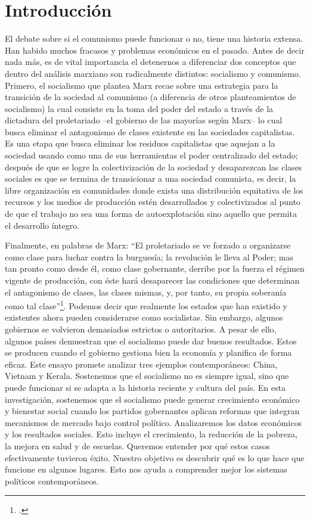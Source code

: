 \documentclass[12pt, letterpaper]{article}
\begin{document}
\section*{Introducción}
\thispagestyle{fancy}
El debate sobre si el comunismo puede funcionar o no, tiene una historia extensa. Han habido muchos fracasos y problemas económicos en el pasado. Antes de decir nada más, es de vital importancia el detenernos a diferenciar dos conceptos que dentro del análisis marxiano son radicalmente distintos: socialismo y comunismo. Primero, el socialismo que plantea Marx recae sobre una estrategia para la transición de la sociedad al comunismo (a diferencia de otros planteamientos de socialismo) la cual consiste en la toma del poder del estado a través de la dictadura del proletariado –el gobierno de las mayorías según Marx– lo cual busca eliminar el antagonismo de clases existente en las sociedades capitalistas. Es una etapa que busca eliminar los residuos capitalistas que aquejan a la sociedad usando como una de sus herramientas el poder centralizado del estado; después de que se logre la colectivización de la sociedad y desaparezcan las clases sociales es que se termina de transicionar a una sociedad comunista, es decir, la libre organización en comunidades donde exista una distribución equitativa de los recursos y los medios de producción estén desarrollados y colectivizados al punto de que el trabajo no sea una forma de autoexplotación sino aquello que permita el desarrollo íntegro.

Finalmente, en palabras de Marx: ``El proletariado se ve forzado a organizarse como clase para luchar contra la burguesía; la revolución le lleva al Poder; mas tan pronto como desde él, como clase gobernante, derribe por la fuerza el régimen vigente de producción, con éste hará desaparecer las condiciones que determinan el antagonismo de clases, las clases mismas, y, por tanto, su propia soberanía como tal clase''\footcite{marx_engels_1848}. Podemos decir que realmente los estados que han existido y existentes ahora pueden considerarse como socialistas. Sin embargo, algunos gobiernos se volvieron demasiados estrictos o autoritarios. A pesar de ello, algunos países demuestran que el socialismo puede dar buenos resultados. Estos se producen cuando el gobierno gestiona bien la economía y planifica de forma eficaz. Este ensayo promete analizar tres ejemplos contemporáneos: China, Vietnam y Kerala. Sostenemos que el socialismo no es siempre igual, sino que puede funcionar si se adapta a la historia reciente y cultura del país. En esta investigación, sostenemos que el socialismo puede generar crecimiento económico y bienestar social cuando los partidos gobernantes aplican reformas que integran mecanismos de mercado bajo control político. Analizaremos los datos económicos y los resultados sociales. Esto incluye el crecimiento, la reducción de la pobreza, la mejora en salud y de escuelas. Queremos entender por qué estos casos efectivamente tuvieron éxito. Nuestro objetivo es descubrir qué es lo que hace que funcione en algunos lugares. Esto nos ayuda a comprender mejor los sistemas políticos contemporáneos.
\end{document}

